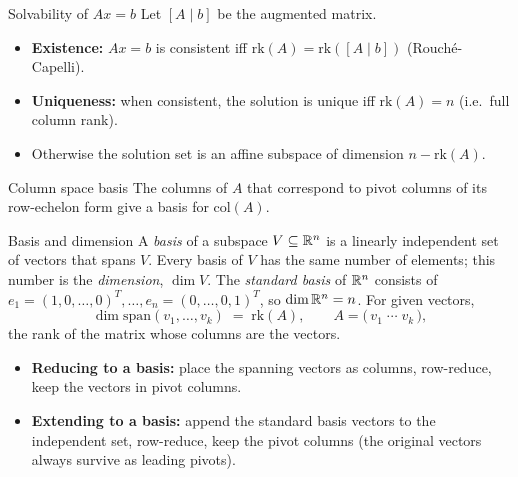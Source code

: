 \begin{rulebox}{Solvability of $A x = b$}
Let $[A \mid b]$ be the augmented matrix.
\begin{itemize}[leftmargin=1.6em,itemsep=0.3ex]
    \item \textbf{Existence:} $A x = b$ is consistent iff
          $\mathrm{rk}(A) = \mathrm{rk}([A \mid b])$ (Rouch{\'e}-Capelli).
    \item \textbf{Uniqueness:} when consistent, the solution is unique iff
          $\mathrm{rk}(A) = n$ (i.e.\ full column rank).
    \item Otherwise the solution set is an affine subspace of dimension
          $n - \mathrm{rk}(A)$.
\end{itemize}
\end{rulebox}

\begin{rulebox}{Column space basis}
The columns of $A$ that correspond to pivot columns of its row-echelon form
give a basis for $\mathrm{col}(A)$.
\end{rulebox}

\begin{rulebox}{Basis and dimension}
A \emph{basis} of a subspace $V \subseteq \mathbb{R}^{n}$ is a
linearly independent set of vectors that spans $V$. Every basis of $V$ has
the same number of elements; this number is the \emph{dimension}, $\dim V$. The \emph{standard basis}
of $\mathbb{R}^{n}$ consists of $e_{1} = (1, 0, \dots, 0)^{T}, \dots,
e_{n} = (0, \dots, 0, 1)^{T}$, so $\dim \mathbb{R}^{n} = n$. For given vectors,
\[
\dim \mathrm{span}(v_{1}, \dots, v_{k}) \;=\; \mathrm{rk}(A),
\qquad A = \bigl(\, v_{1} \;\cdots\; v_{k} \,\bigr),
\]
the rank of the matrix whose columns are the vectors.
\begin{itemize}[leftmargin=1.6em,itemsep=0.3ex]
    \item \textbf{Reducing to a basis:} place the spanning vectors as
          columns, row-reduce, keep the vectors in pivot columns.
    \item \textbf{Extending to a basis:} append the standard basis vectors
          to the independent set, row-reduce, keep the pivot columns (the
          original vectors always survive as leading pivots).
\end{itemize}
\end{rulebox}


